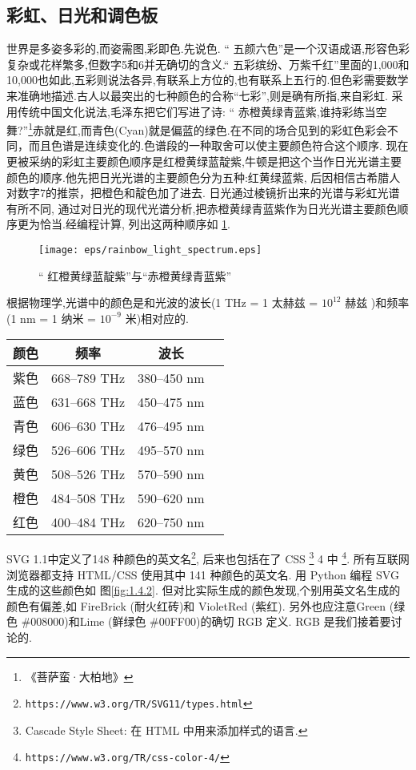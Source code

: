 \subsection{彩虹、日光和调色板}
世界是多姿多彩的,而姿需图,彩即色.先说色.
“ 五颜六色”是一个汉语成语,形容色彩复杂或花样繁多,但数字5和6并无确切的含义.“ 
五彩缤纷、万紫千红”里面的1,000和10,000也如此,五彩则说法各异,有联系上方位的,也有联系上五行的.但色彩需要数学来准确地描述.古人以最突出的七种颜色的合称“七彩”,则是确有所指,来自彩虹.
采用传统中国文化说法,毛泽东把它们写进了诗: “ 赤橙黄绿青蓝紫,谁持彩练当空舞?”\footnote{《菩萨蛮·大柏地》}赤就是红,而青色(Cyan)就是偏蓝的绿色.在不同的场合见到的彩虹色彩会不同，而且色谱是连续变化的.色谱段的一种取舍可以使主要颜色符合这个顺序.
现在更被采纳的彩虹主要颜色顺序是红橙黄绿蓝靛紫,牛顿是把这个当作日光光谱主要颜色的顺序.他先把日光光谱的主要颜色分为五种:红黄绿蓝紫,
后因相信古希腊人对数字7的推崇，把橙色和靛色加了进去.
日光通过棱镜折出来的光谱与彩虹光谱有所不同,
通过对日光的现代光谱分析,把赤橙黄绿青蓝紫作为日光光谱主要颜色顺序更为恰当.经编程计算, 列出这两种顺序如 \ref{fig:1.4.1}.

\begin{figure}[h]
	\centering
	\texttt{[image: eps/rainbow\_light\_spectrum.eps]}
	\caption{“ 红橙黄绿蓝靛紫”与“赤橙黄绿青蓝紫” }
	\label{fig:1.4.1}
\end{figure}
根据物理学,光谱中的颜色是和光波的波长(1 THz = 1 太赫兹 = $10^{12}$ 赫兹 )和频率(1 nm = 1 纳米 = $10^{-9}$ 米)相对应的.
\begin{center}
	\begin{tabular}{c c c c} 
		\hline
		颜色 & 频率 & 波长  \\ [0.5ex] 
		\hline
		紫色 & 668–789 THz & 380–450 nm \\
		蓝色 & 631–668 THz & 450–475 nm \\
		青色 & 606–630 THz & 476–495 nm \\
		绿色 & 526–606 THz & 495–570 nm \\
		黄色 & 508–526 THz & 570–590 nm \\
		橙色 & 484–508 THz & 590–620 nm \\
		红色 & 400–484 THz & 620–750 nm \\		
		\hline
	\end{tabular}
\end{center}

SVG 1.1中定义了148 种颜色的英文名\footnote{ \texttt{https://www.w3.org/TR/SVG11/types.html}}, 
后来也包括在了 CSS \footnote{Cascade Style Sheet: 在 HTML 中用来添加样式的语言.} 4 中 \footnote{ \texttt{https://www.w3.org/TR/css-color-4/}}.
所有互联网浏览器都支持 HTML/CSS 使用其中 141 种颜色的英文名.
用 Python 编程 SVG 生成的这些颜色如 图\ref{fig:1.4.2}.
但对比实际生成的颜色发现,个别用英文名生成的颜色有偏差,如 FireBrick (耐火红砖)和
VioletRed (紫红). 另外也应注意Green (绿色 \#{}008000)和Lime (鲜绿色 \#{}00FF00)的确切 RGB 定义. RGB 是我们接着要讨论的.


